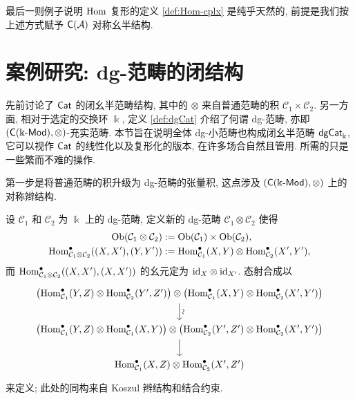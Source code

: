 最后一则例子说明 $\operatorname{Hom}$ 复形的定义 \ref{def:Hom-cplx} 是纯乎天然的, 前提是我们按上述方式赋予 $\mathsf{C}(\mathcal{A})$ 对称幺半结构.

\section{案例研究: dg-范畴的闭结构}\label{sec:dg-closed}
先前讨论了 $\mathsf{Cat}$ 的闭幺半范畴结构, 其中的 $\otimes$ 来自普通范畴的积 $\mathcal{C}_1 \times \mathcal{C}_2$. 另一方面, 相对于选定的交换环 $\Bbbk$, 定义 \ref{def:dgCat} 介绍了何谓 dg-范畴, 亦即 $(\mathsf{C}(\Bbbk\text{-}\mathsf{Mod}), \otimes)$-充实范畴. 本节旨在说明全体 dg-小范畴也构成闭幺半范畴 $\mathsf{dgCat}_{\Bbbk}$, 它可以视作 $\mathsf{Cat}$ 的线性化以及复形化的版本, 在许多场合自然且管用. 所需的只是一些繁而不难的操作.

第一步是将普通范畴的积升级为 dg-范畴的张量积, 这点涉及 $(\mathsf{C}(\Bbbk\text{-}\mathsf{Mod}), \otimes)$ 上的对称辫结构.

\begin{definition}\label{def:dgCat-tensor}
	设 $\mathcal{C}_1$ 和 $\mathcal{C}_2$ 为 $\Bbbk$ 上的 dg-范畴, 定义新的 dg-范畴 $\mathcal{C}_1 \otimes \mathcal{C}_2$ 使得
	\begin{align*}
		\operatorname{Ob}(\mathcal{C}_1 \otimes \mathcal{C}_2) & := \operatorname{Ob}(\mathcal{C}_1) \times \operatorname{Ob}(\mathcal{C}_2), \\
		\operatorname{Hom}_{\mathcal{C}_1 \otimes \mathcal{C}_2}^\bullet((X, X'), (Y, Y')) & := \operatorname{Hom}_{\mathcal{C}_1}^\bullet(X, Y) \otimes \operatorname{Hom}_{\mathcal{C}_2}^\bullet(X', Y'),
	\end{align*}
	而 $\operatorname{Hom}_{\mathcal{C}_1 \otimes \mathcal{C}_2}^\bullet((X, X'), (X, X'))$ 的幺元定为 $\mathrm{id}_X \otimes \mathrm{id}_{X'}$. 态射合成以
	\[\begin{tikzcd}
		\left( \Hom_{\mathcal{C}_1}^\bullet(Y, Z) \otimes \Hom_{\mathcal{C}_2}^\bullet(Y', Z')\right) \otimes
		\left( \Hom_{\mathcal{C}_1}^\bullet(X, Y) \otimes \Hom_{\mathcal{C}_2}^\bullet(X', Y') \right) \arrow[d, "\sim" sloped] \\
		\left( \Hom_{\mathcal{C}_1}^\bullet(Y, Z) \otimes \Hom_{\mathcal{C}_1}^\bullet(X, Y) \right) \otimes
		\left( \Hom_{\mathcal{C}_2}^\bullet(Y', Z') \otimes \Hom_{\mathcal{C}_2}^\bullet(X', Y') \right) \arrow[d] \\
		\Hom_{\mathcal{C}_1}^\bullet(X, Z) \otimes \Hom_{\mathcal{C}_2}^\bullet(X', Z')
	\end{tikzcd}\]
	来定义; 此处的同构来自 Koszul 辫结构和结合约束.
\end{definition}

